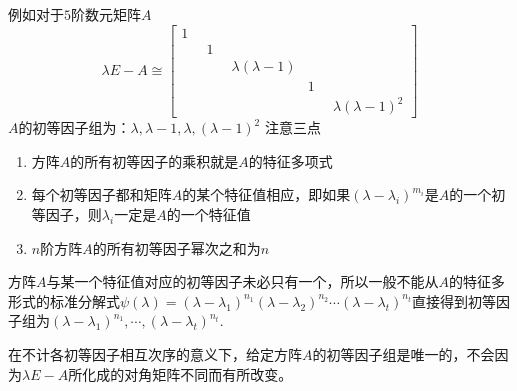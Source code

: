 \documentclass[a4paper,11pt]{article}
\begin{document}
    例如对于$5$阶数元矩阵$A$
    \begin{equation*}
        \lambda E-A\cong\begin{bmatrix}
            1&\quad&\quad&\quad&\quad\\
            \quad&1&\quad&\quad&\quad\\
            \quad&\quad&\lambda(\lambda-1)&\quad&\quad\\
            \quad&\quad&\quad&1&\quad\\
            \quad&\quad&\quad&\quad&\lambda(\lambda-1)^2
        \end{bmatrix}
    \end{equation*}
    $A$的初等因子组为：$\lambda,\lambda-1,\lambda,(\lambda-1)^2$
    注意三点
    \begin{enumerate}
        \item 方阵$A$的所有初等因子的乘积就是$A$的特征多项式
        \item 每个初等因子都和矩阵$A$的某个特征值相应，即如果$(\lambda-\lambda_i)^{m_i}$是$A$的一个初等因子，则$\lambda_i$一定是$A$的一个特征值
        \item $n$阶方阵$A$的所有初等因子幂次之和为$n$
    \end{enumerate}
    方阵$A$与某一个特征值对应的初等因子未必只有一个，所以一般不能从$A$的特征多形式的标准分解式$\psi(\lambda)=(\lambda-\lambda_1)^{n_1}(\lambda-\lambda_2)^{n_2}\cdots(\lambda-\lambda_t)^{n_t}$直接得到初等因子组为$(\lambda-\lambda_1)^{n_1},\cdots,(\lambda-\lambda_t)^{n_t}$.

    在不计各初等因子相互次序的意义下，给定方阵$A$的初等因子组是唯一的，不会因为$\lambda E-A$所化成的对角矩阵不同而有所改变。
\end{document}
